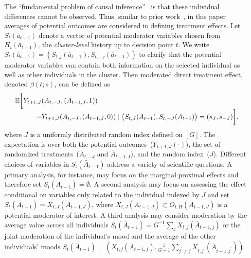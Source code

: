 \documentclass[12pt]{article}
\newcommand{\zw}[1]{\textcolor{blue}{[\textit{ZW: #1}]}}
\begin{document}
The ``fundamental problem of causal inference''~\citep{Rubin, Pearl2009} is that these individual differences cannot be observed. Thus, similar to prior work~\citep{DempseyAOAS, Boruvkaetal}, in this paper averages of potential outcomes are considered in defining treatment effects. Let $S_t (\bar a_{t-1})$ denote a vector of potential moderator variables chosen from $H_t (\bar a_{t-1})$, the \emph{cluster-level} history up to decision point $t$.  We write $S_t (\bar a_{t-1}) = \left( S_{t,j} (\bar a_{t-1}), S_{t,-j} (\bar a_{t-1}) \right)$ to clarify that the potential moderator variables can contain both information on the selected individual as well as other individuals in the cluster. Then moderated direct treatment effect, denoted $\beta (t; s)$, can be defined as
\begin{equation}
\label{eq:directavglineareffect}
\begin{array}{r@{}l}
\mathbb{E} \bigg[ Y_{t+1,J} &(\bar A_{t,-J}, (\bar A_{t-1,J}, 1)) \\
- &Y_{t+1,J} (\bar A_{t,-J}, (\bar A_{t-1,J}, 0)) \mid \left( S_{t,J} (\bar A_{t-1}), S_{t,-J} (\bar A_{t-1}) \right) = (s_J, s_{-J}) \bigg].
\end{array}
\end{equation}
where $J$ is a uniformly distributed random index defined on $[G]$. The expectation is over both the potential outcomes~($Y_{t+1,J}(\cdot)$), the set of randomized treatments~($\bar A_{t,-J}$ and $\bar A_{t-1,J}$), and the random index~($J$).
Different choices of variables in $S_t (\bar A_{t-1})$ address a variety of scientific questions.  A primary analysis, for instance, may focus on the marginal proximal effects and therefore set $S_t (\bar A_{t-1}) = \emptyset$.  A second analysis may focus on assessing the effect conditional on variables only related to the individual indexed by $J$ and set $S_t (\bar A_{t-1}) = X_{t,J} (\bar A_{t-1,J})$, where $X_{t,J} (\bar A_{t-1,J}) \subset O_{t,H} (\bar A_{t-1,J})$ is a potential moderator of interest.  A third analysis may consider moderation by the average value across all individuals $S_t (\bar A_{t-1}) = G^{-1} \sum_j X_{t,j} (\bar A_{t-1,j})$ or the joint moderation of the individual's mood and the average of the other individuals' moods $S_t (\bar A_{t-1}) = \left( X_{t,j}(\bar A_{t-1,j}), \frac{1}{G-1} \sum_{j^\prime \neq j} X_{t,j^\prime} (\bar A_{t-1,j^\prime}) \right)$.
\end{document}
